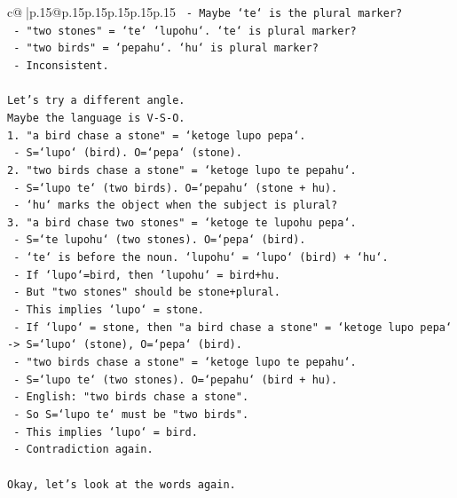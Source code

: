 \documentclass{article}
\begin{document}
{\begin{supertabular}{c@{$\;$}|p{.15\linewidth}@{}p{.15\linewidth}p{.15\linewidth}p{.15\linewidth}p{.15\linewidth}p{.15\linewidth}}
{{{\texttt{   {-} Maybe `te` is the plural marker?} \\
\texttt{   {-} "two stones" = `te` `lupohu`. `te` is plural marker?} \\
\texttt{   {-} "two birds" = `pepahu`. `hu` is plural marker?} \\
\texttt{   {-} Inconsistent.} \\
\\ 
\texttt{Let's try a different angle.} \\
\texttt{Maybe the language is V{-}S{-}O.} \\
\texttt{1. "a bird chase a stone" = `ketoge lupo pepa`.} \\
\texttt{   {-} S=`lupo` (bird). O=`pepa` (stone).} \\
\texttt{2. "two birds chase a stone" = `ketoge lupo te pepahu`.} \\
\texttt{   {-} S=`lupo te` (two birds). O=`pepahu` (stone + hu).} \\
\texttt{   {-} `hu` marks the object when the subject is plural?} \\
\texttt{3. "a bird chase two stones" = `ketoge te lupohu pepa`.} \\
\texttt{   {-} S=`te lupohu` (two stones). O=`pepa` (bird).} \\
\texttt{   {-} `te` is before the noun. `lupohu` = `lupo` (bird) + `hu`.} \\
\texttt{   {-} If `lupo`=bird, then `lupohu` = bird+hu.} \\
\texttt{   {-} But "two stones" should be stone+plural.} \\
\texttt{   {-} This implies `lupo` = stone.} \\
\texttt{   {-} If `lupo` = stone, then "a bird chase a stone" = `ketoge lupo pepa` {-}> S=`lupo` (stone), O=`pepa` (bird).} \\
\texttt{   {-} "two birds chase a stone" = `ketoge lupo te pepahu`.} \\
\texttt{   {-} S=`lupo te` (two stones). O=`pepahu` (bird + hu).} \\
\texttt{   {-} English: "two birds chase a stone".} \\
\texttt{   {-} So S=`lupo te` must be "two birds".} \\
\texttt{   {-} This implies `lupo` = bird.} \\
\texttt{   {-} Contradiction again.} \\
\\ 
\texttt{Okay, let's look at the words again.} \\
}}}
\end{supertabular}}
\end{document}
